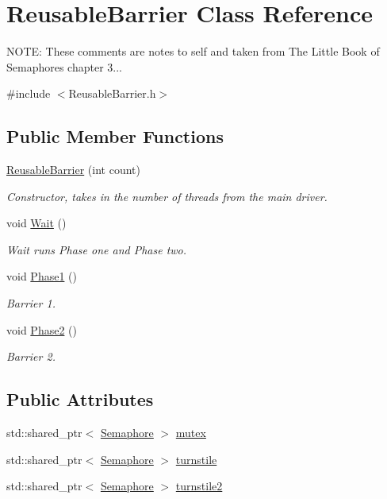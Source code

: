 \hypertarget{class_reusable_barrier}{}\section{Reusable\+Barrier Class Reference}
\label{class_reusable_barrier}


N\+O\+TE\+: These comments are notes to self and taken from The Little Book of Semaphores chapter 3...  




{\ttfamily \#include $<$Reusable\+Barrier.\+h$>$}

\subsection*{Public Member Functions}
\begin{DoxyCompactItemize}
\item 
\mbox{\hyperlink{class_reusable_barrier_ae383e4b8c0407a21bbf47c6fccec6b15}{Reusable\+Barrier}} (int count)
\begin{DoxyCompactList}\small\item\em Constructor, takes in the number of threads from the main driver. \end{DoxyCompactList}\item 
void \mbox{\hyperlink{class_reusable_barrier_ad3545683b5538142ca6377c3a95552f2}{Wait}} ()
\begin{DoxyCompactList}\small\item\em Wait runs Phase one and Phase two. \end{DoxyCompactList}\item 
void \mbox{\hyperlink{class_reusable_barrier_a9335a815242eff0807f91b63416d4e56}{Phase1}} ()
\begin{DoxyCompactList}\small\item\em Barrier 1. \end{DoxyCompactList}\item 
void \mbox{\hyperlink{class_reusable_barrier_a32b1701adeedd4d968118a152cd3f47d}{Phase2}} ()
\begin{DoxyCompactList}\small\item\em Barrier 2. \end{DoxyCompactList}\end{DoxyCompactItemize}
\subsection*{Public Attributes}
\begin{DoxyCompactItemize}
\item 
std\+::shared\+\_\+ptr$<$ \mbox{\hyperlink{class_semaphore}{Semaphore}} $>$ \mbox{\hyperlink{class_reusable_barrier_a57c8cdb580366e8516d7af2f55fb3ddb}{mutex}}
\item 
std\+::shared\+\_\+ptr$<$ \mbox{\hyperlink{class_semaphore}{Semaphore}} $>$ \mbox{\hyperlink{class_reusable_barrier_a1fdd613c9544878112266f8f65797570}{turnstile}}
\item 
std\+::shared\+\_\+ptr$<$ \mbox{\hyperlink{class_semaphore}{Semaphore}} $>$ \mbox{\hyperlink{class_reusable_barrier_a010da417ee66e6103e57004f9dbe2347}{turnstile2}}
\end{DoxyCompactItemize}


